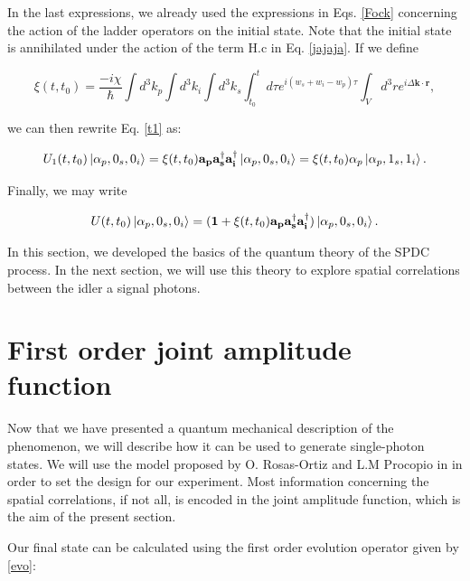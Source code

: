 \documentclass[12pt]{book}
\begin{document}
In the last expressions, we already used the expressions in Eqs. \ref{Fock}  concerning the action of the ladder operators on the initial state. Note that the initial state is annihilated under the action of the term $\mathrm{H.c}$ in Eq. \ref{jajaja}.  If we define 

\begin{equation}
 \xi(t,t_{0})=\frac{-i\chi}{\hbar}  \int d^{3}k_{p}\int d^{3}k_{i} \int d^{3}k_{s}    \int_{t_{0}}^{t} d\tau e^{i(w_{s}+w_{i}-w_{p})\tau}  
\int_{V} d^{3}r  e^{i \Delta\textbf{k} \cdot\textbf{r}} ,
\end{equation}



we can then rewrite Eq. \ref{t1} as:

\begin{equation}
U_{1}(t,t_{0})\ket{\alpha_{p},0_{s},0_{i}}=\xi(t,t_{0}) \mathbf{a_{p}}\mathbf{a_{s}^{\dagger}}\mathbf{a_{i}^{\dagger}}\ket{\alpha_{p},0_{s},0_{i}}=\xi(t,t_{0}) \alpha_{p} \ket{\alpha_{p},1_{s},1_{i}}.
\end{equation}

Finally, we may write

\begin{equation}
    U(t,t_{0})\ket{\alpha_{p},0_{s},0_{i}}=(\mathbf{1}+\xi(t,t_{0}) \mathbf{a_{p}}\mathbf{a_{s}^{\dagger}}\mathbf{a_{i}^{\dagger}})\ket{\alpha_{p},0_{s},0_{i}}. \label{evo}
\end{equation}

In this section, we developed the basics of the quantum theory of the SPDC process. In the next section, we will use this theory to explore spatial correlations between the idler a signal photons.

\section{First order joint amplitude function}

Now that we have presented a quantum mechanical description of the phenomenon, we will describe how it can be used to generate single-photon states. We will use the model proposed by O. Rosas-Ortiz and L.M Procopio in \cite{procopio} in order to set the design for our experiment. Most information concerning the spatial correlations, if not all, is encoded in the joint amplitude function, which is the aim of the present section. 



  Our final state can be calculated using the first order evolution operator given by \ref{evo}:
\end{document}
